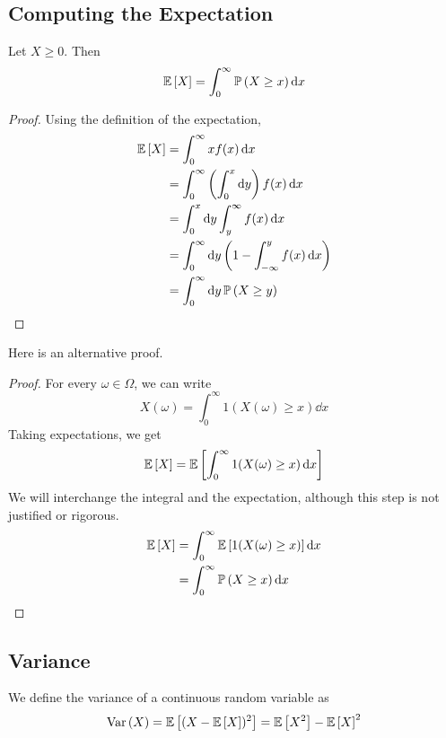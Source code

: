 \documentclass{article}
\begin{document}
\subsection{Computing the Expectation}
\begin{claim}
    Let $X \geq 0$. Then
    \[ \mathbb{E}\left[{X}\right] = \int_0^\infty \mathbb{P}\left({X \geq x}\right) \dd{x} \]
\end{claim}
\begin{proof}
    Using the definition of the expectation,
    \begin{align*}
        \mathbb{E}\left[{X}\right] & = \int_0^\infty xf(x) \dd{x}                                           \\
                   & = \int_0^\infty \left( \int_0^x \dd{y} \right) f(x) \dd{x}             \\
                   & = \int_0^x \dd{y} \int_y^\infty f(x) \dd{x}                            \\
                   & = \int_0^\infty \dd{y} \left( 1 - \int_{-\infty}^y f(x) \dd{x} \right) \\
                   & = \int_0^\infty \dd{y} \mathbb{P}\left({X \geq y}\right)
    \end{align*}
\end{proof}
\noindent Here is an alternative proof.
\begin{proof}
    For every $\omega \in \Omega$, we can write
    \[ X(\omega) = \int_0^\infty 1(X(\omega) \geq x) \dd{x} \]
    Taking expectations, we get
    \[ \mathbb{E}\left[{X}\right] = \mathbb{E}\left[{\int_0^\infty 1(X(\omega) \geq x) \dd{x}}\right] \]
    We will interchange the integral and the expectation, although this step is not justified or rigorous.
    \begin{align*}
        \mathbb{E}\left[{X}\right] & = \int_0^\infty \mathbb{E}\left[{1(X(\omega) \geq x)}\right] \dd{x} \\
                   & = \int_0^\infty \mathbb{P}\left({X \geq x}\right) \dd{x}
    \end{align*}
\end{proof}

\subsection{Variance}
We define the variance of a continuous random variable as
\[ \operatorname{Var}\left({X}\right) = \mathbb{E}\left[{(X - \mathbb{E}\left[{X}\right])^2}\right] = \mathbb{E}\left[{X^2}\right] - \mathbb{E}\left[{X}\right]^2 \]
\end{document}
